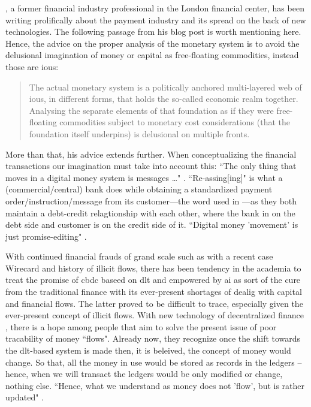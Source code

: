 \citeauthor{scott2022}, a former financial industry professional in the London financial center, has been writing prolifically about the payment industry and its spread on the back of new technologies. The following passage from his blog post is worth mentioning here. Hence, the advice on the proper analysis of the monetary system is to avoid the delusional imagination of money or capital as free-floating commodities, instead those are \acp{iou}:

\begin{quote}
The actual monetary system is a politically anchored multi-layered web of \acp{iou}, in different forms, that holds the so-called economic realm together. Analysing the separate elements of that foundation as if they were free-floating commodities subject to monetary cost considerations (that the foundation itself underpins) is delusional on multiple fronts. \citep{scott2024}
\end{quote}

More than that, his advice extends further. When conceptualizing the financial transactions our imagination must take into account this: ``The only thing that moves in a digital money system is messages \dots" \citep[p.~75]{scott2022}. ``Re-assing[ing]" is what a (commercial/central) bank does while obtaining a standardized payment order/instruction/message from its customer---the word used in \citep[p.~75]{scott2022}---as they both maintain a debt-credit relagtionship with each other, where the bank in on the debt side and customer is on the credit side of it. ``Digital money 'movement' is just promise-editing" \citep[p.~72]{scott2022}.

With continued financial frauds of grand scale such as with a recent case Wirecard and history of illicit flows, there has been tendency in the academia to treat the promise of \ac{cbdc} baseed on \ac{dlt} and empowered by \ac{ai} as sort of the cure from the traditional finance with its ever-present shortages of dealig with capital and financial flows. The latter proved to be difficult to trace, especially given the ever-present concept of illicit flows. With new technology of decentralized finance , there is a hope among people that aim to solve the present issue of poor tracability of money ``flows". Already now, they recognize once the shift towards the \ac{dlt}-based system is made then, it is beleived, the concept of money would change. So that, all the money in use would be stored as records in the ledgers -- hence, when we will transact the ledgers would be only modified or change, nothing else. ``Hence, what we understand as money does not 'flow', but is rather updated" \citep[p.~615]{westermeier2023}. 

